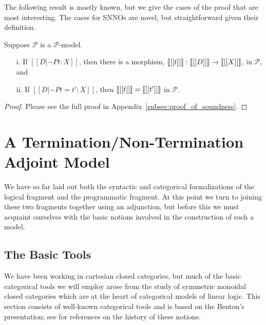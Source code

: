 \documentclass{article}
\let\mto\to
\let\to\rightarrow
\newcommand{\cat}[1]{\mathcal{#1}}
\begin{document}
The following result is mostly known, but we give the cases of the
proof that are most interesting.  The cases for SNNOs are novel, but
straightforward given their definition.
\begin{theorem}[Soundness]
  \label{theorem:P-soundness}
  Suppose $\cat{P}$ is a $\cat{P}$-model.
  \begin{itemize}
  \item[i.] If $[[D |-P t : X]]$, then there is a morphism,
    $\interp{[[t]]} : \interp{[[D]]} \mto \interp{[[X]]}$, in
    $\cat{P}$, and
  \item[ii.] If $[[D |-P t = t' : X]]$,
    then $\llbracket [[t]] \rrbracket = \llbracket [[t']] \rrbracket$ in $\cat{P}$.
  \end{itemize}
\end{theorem}
\begin{proof}
  Please see the full proof in
  Appendix~\ref{subsec:proof_of_soundness}.
\end{proof}

\section{A Termination/Non-Termination Adjoint Model}
\label{sec:a_termination/non-termination_adjoint_model}
We have so far laid out both the syntactic and categorical
formalizations of the logical fragment and the programmatic fragment.
At this point we turn to joining these two fragments together using an
adjunction, but before this we must acquaint ourselves with the basic
notions involved in the construction of such a model.

\subsection{The Basic Tools}
\label{subsec:the_basic_tools}
We have been working in cartesian closed categories, but much of the
basic categorical tools we will employ arose from the study of
symmetric monoidal closed categories which are at the heart of
categorical models of linear logic.  This section consists of
well-known categorical tools and is based on the Benton's
presentation; see \cite{?} for references on the history of these
notions.
\end{document}
